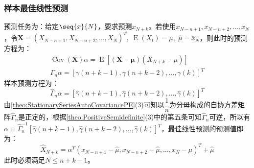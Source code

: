\subsubsection{样本最佳线性预测}
\begin{derivation}
	预测任务为：给定$\seq{x}{N}$，要求预测$x_{N+k}$。若使用$x_{N-n+1},x_{N-n+2},\dots,x_{N}$，令$\mathbf{X}=(X_{N-n+1},X_{N-n+2},\dots,X_N)^T,\;\operatorname{E}(X_t)=\mu,\;\hat{\mu}=\bar{x}_N$，则此时的预测方程为：
	\begin{gather*}
		\operatorname{Cov}(\mathbf{X})\alpha=\operatorname{E}[(\mathbf{X}-\boldsymbol{\mu})(X_{N+k}-\mu)] \\
		\Gamma_n\alpha=[\gamma(n+k-1),\gamma(n+k-2),\dots,\gamma(k)]^T
	\end{gather*}
	样本预测方程为：
	\begin{equation*}
		\hat{\Gamma}_n\alpha=[\hat{\gamma}(n+k-1),\hat{\gamma}(n+k-2),\dots,\hat{\gamma}(k)]^T
	\end{equation*}
	由\cref{theo:StationarySeriesAutoCovariancePE}(3)可知以$\dfrac{1}{n}$为分母构成的自协方差矩阵$\hat{\Gamma}_n$是正定的，根据\cref{theo:PositiveSemidefinite}(3)中的第五条可知$\hat{\Gamma}_n$可逆，所以有$\alpha=\hat{\Gamma}_n^{-1}[\hat{\gamma}(n+k-1),\hat{\gamma}(n+k-2),\dots,\hat{\gamma}(k)]^T$，最佳线性预测的预测值即为：
	\begin{equation*}
		\hat{X}_{N+k}=\alpha^T(x_{N-n+1}-\hat{\mu},x_{N-n+2}-\hat{\mu},\dots,x_{N}-\hat{\mu})^T+\hat{\mu}
	\end{equation*}
	此时必须满足$N\leqslant n+k-1$。
\end{derivation}


